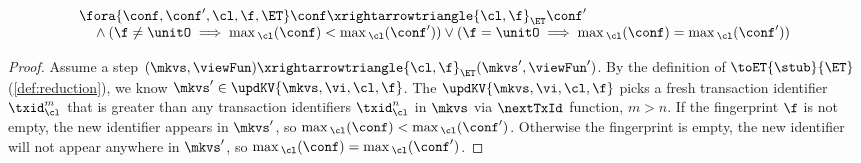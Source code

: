 \begin{lemma}
\label{lem:kv-max-cl}
\[
\begin{array}{@{}l}
    \fora{\conf, \conf' ,\cl, \f, \ET}
    \conf \xrightarrowtriangle{\cl, \f}_{\ET}  \conf' \\
    \quad {} \land ( \f \neq \unitO \implies \max{}_\cl(\conf) < \max{}_\cl(\conf') ) \lor ( \f = \unitO \implies \max{}_\cl(\conf) = \max{}_\cl(\conf') )
\end{array}
\]
\end{lemma}
\begin{proof}
    Assume a step \( (\mkvs, \viewFun) \xrightarrowtriangle{\cl, \f}_{\ET} (\mkvs', \viewFun') \).
    By the definition of \( \toET{\stub}{\ET}\) (\cref{def:reduction}), we know \( \mkvs' \in \updKV{\mkvs, \vi, \cl, \f} \).
    The \( \updKV{\mkvs, \vi, \cl, \f} \) picks a fresh transaction identifier \( \txid_\cl^{m} \) that is greater than any transaction identifiers \( \txid_\cl^{n} \) in \( \mkvs \) via \( \nextTxId \) function, \ie \( m > n \).
    If the fingerprint \( \f \) is not empty, the new identifier appears in \( \mkvs' \), so \( \max{}_\cl(\conf) < \max{}_\cl(\conf') \).
    Otherwise  the fingerprint is empty, the new identifier will not appear anywhere in \( \mkvs' \), so \( \max{}_\cl(\conf) = \max{}_\cl(\conf') \). 
\end{proof}

